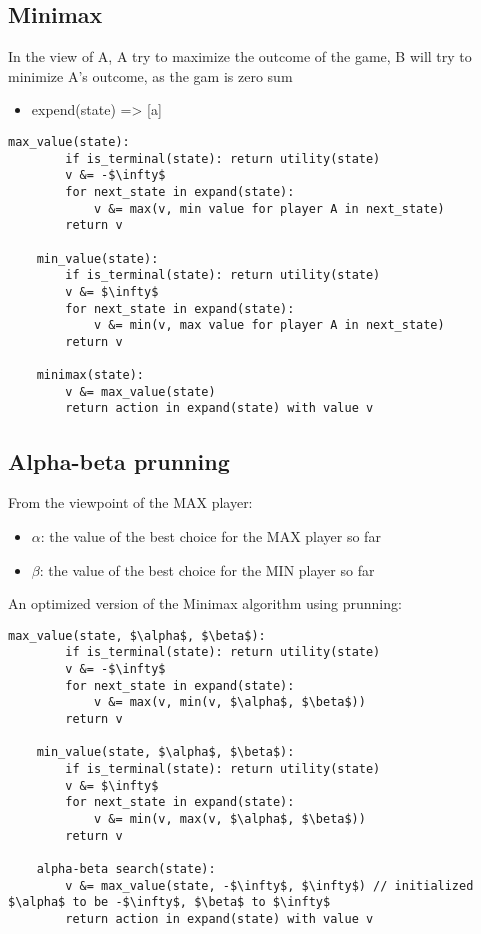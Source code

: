 \documentclass{article}
\begin{document}
\subsection{Minimax}
In the view of A, A try to maximize the outcome of the game, B will try to minimize A's outcome, as the gam is zero sum\newline
\begin{itemize}
    \item expend(state) => [a]
    

\end{itemize}
\begin{lstlisting}[mathescape=true]
    max_value(state):
        if is_terminal(state): return utility(state)
        v &= -$\infty$
        for next_state in expand(state):
            v &= max(v, min value for player A in next_state)
        return v
    
    min_value(state):
        if is_terminal(state): return utility(state)
        v &= $\infty$
        for next_state in expand(state):
            v &= min(v, max value for player A in next_state)
        return v

    minimax(state): 
        v &= max_value(state)
        return action in expand(state) with value v
\end{lstlisting}

\subsection{Alpha-beta prunning}
From the viewpoint of the MAX player:
\begin{itemize}
    \item $\alpha$: the value of the best choice for the MAX player so far
    \item $\beta$: the value of the best choice for the MIN player so far
\end{itemize}
An optimized version of the Minimax algorithm using prunning:
\begin{lstlisting}[mathescape=true]
    max_value(state, $\alpha$, $\beta$):
        if is_terminal(state): return utility(state)
        v &= -$\infty$
        for next_state in expand(state):
            v &= max(v, min(v, $\alpha$, $\beta$))
        return v
    
    min_value(state, $\alpha$, $\beta$):
        if is_terminal(state): return utility(state)
        v &= $\infty$
        for next_state in expand(state):
            v &= min(v, max(v, $\alpha$, $\beta$))
        return v

    alpha-beta search(state): 
        v &= max_value(state, -$\infty$, $\infty$) // initialized $\alpha$ to be -$\infty$, $\beta$ to $\infty$
        return action in expand(state) with value v
\end{lstlisting}
\end{document}
